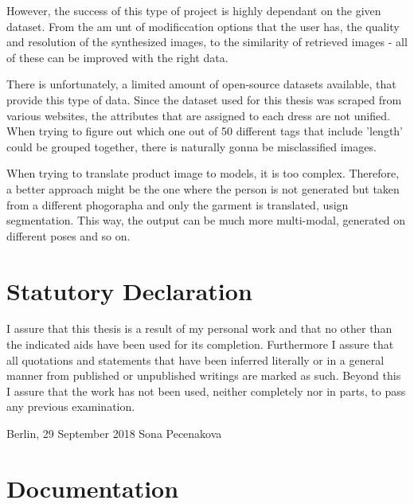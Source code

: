\documentclass[12pt]{report}
\begin{document}
However, the success of this type of project is highly dependant on the given dataset. From the am unt of modificcation options that the user has, the quality and resolution of the synthesized images, to the similarity of retrieved images - all of these can be improved with the right data.

There is unfortunately, a limited amount of open-source datasets available, that provide this type of data. Since the dataset used for this thesis was scraped from various websites, the attributes that are assigned to each dress are not unified. When trying to figure out which one out of 50 different tags that include 'length' could be grouped together, there is naturally gonna be misclassified images.

When trying to translate product image to models, it is too complex. Therefore, a better approach might be the one where the person is not generated but taken from a different phogorapha and only the garment is translated, usign segmentation. This way, the output can be much more multi-modal, generated on different poses and so on.




\appendix

\newpage
{}

\renewcommand{\refname}{Bibliography}

\clearpage

\pagestyle{plain}
\chapter*{Statutory Declaration}
I assure that this thesis is a result of my personal work and that no other than the indicated aids have been used for its completion. Furthermore I assure that all quotations and statements that have been inferred literally or in a general manner from published or unpublished writings are marked as such. Beyond this I assure that the work has not been used, neither completely nor in parts, to pass any previous examination.

\vspace{2cm}
\noindent
Berlin, 29 September 2018
\hfill
Sona Pecenakova
\clearpage

\chapter*{Documentation}
\end{document}
